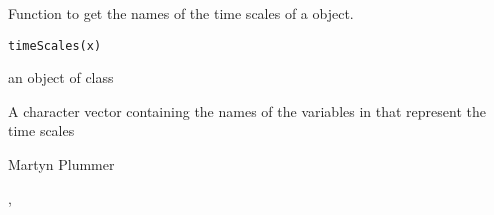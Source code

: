 \begin{Description}\relax
Function to get the names of the time scales of a  object.
\end{Description}
\begin{Usage}
\begin{verbatim}
timeScales(x)
\end{verbatim}
\end{Usage}
\begin{Arguments}
\begin{ldescription}
\item[\code{x}] an object of class 
\end{ldescription}
\end{Arguments}
\begin{Value}
A character vector containing the names of the variables in 
that represent the time scales
\end{Value}
\begin{Author}\relax
Martyn Plummer
\end{Author}
\begin{SeeAlso}\relax
{}, 
\end{SeeAlso}


